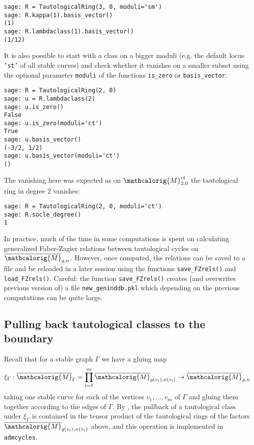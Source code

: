 \documentclass[11pt]{article}
\newcommand{\M}{\ensuremath{\overline{\mathcalorig{M}}}}
\newcommand{\admcycles}{\texttt{admcycles}}
\begin{document}
\begin{lstlisting}
sage: R = TautologicalRing(3, 0, moduli='sm')
sage: R.kappa(1).basis_vector()
(1)
sage: R.lambdaclass(1).basis_vector()
(1/12)
\end{lstlisting}
It is also possible to start with a class on a bigger moduli (e.g. the default locus \texttt{'st'} of all stable curves) and check whether it vanishes on a smaller subset using the optional parameter \texttt{moduli} of the functions \verb|is_zero| or \verb|basis_vector|:
\newpage
\begin{lstlisting}
sage: R = TautologicalRing(2, 0)
sage: u = R.lambdaclass(2)
sage: u.is_zero()
False
sage: u.is_zero(moduli='ct')
True
sage: u.basis_vector()
(-3/2, 1/2)
sage: u.basis_vector(moduli='ct')
()
\end{lstlisting}
The vanishing here was expected as on $\mathcalorig{M}^{\mathrm{ct}}_{2,0}$ the tautological ring in degree $2$ vanishes:
\begin{lstlisting}
sage: R = TautologicalRing(2, 0, moduli='ct')
sage: R.socle_degree()
1
\end{lstlisting}

In practice, much of the time in some computations is spent on calculating generalized Faber-Zagier relations between tautological cycles on $\M_{g,n}$. However, once computed, the relations can be saved to a file and be reloaded in a later session using the functions \verb|save_FZrels()| and \verb|load_FZrels()|. Careful: the function \verb|save_FZrels()| creates (and overwrites previous version of) a file \verb|new_geninddb.pkl| which depending on the previous computations can be quite large.

\subsection{Pulling back tautological classes to the boundary} \label{Sect:tautpullback}
Recall that for a stable graph $\Gamma$ we have a gluing map
\begin{equation} \label{eqn:xigamma} \xi_\Gamma : \M_{\Gamma} = \prod_{i=1}^m \M_{g(v_i),n(v_i)} \to \M_{g,n}\end{equation}
taking one stable curve for each of the vertices $v_1, \ldots, v_m$ of $\Gamma$ and gluing them together according to the edges of $\Gamma$. By \cite[Appendix A]{Graber2001}, the pullback of a tautological class under $\xi_\Gamma$ is contained in the tensor product of the tautological rings of the factors $\M_{g(v_i),n(v_i)}$ above, and this operation is implemented in \admcycles.
\end{document}
